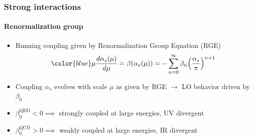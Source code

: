 \documentclass[aspectratio=43]{beamer}
\begin{document}
\begin{frame}

	\frametitle{Strong interactions}
	\framesubtitle{Renormalization group}
	
	\begin{itemize}
		\item Running coupling given by Renormalization Group Equation (RGE)
		\begin{equation}
			{\color{blue}\mu\frac{d\alpha_{s}(\mu)}{d\mu} = \beta(\alpha_{s}(\mu)) = -\sum_{n = 0}^{\infty} \beta_{n} \Big( \frac{\alpha_{s}}{\pi} \Big)^{n + 1}} \nonumber
		\end{equation}
		\item Coupling {\color{blue}$\alpha_{s}$} evolves with scale {\color{blue}$\mu$} as given by RGE $\rightarrow$ LO behavior driven by $\beta_{0}$
		\item $\beta_{0}^{\textrm{QED}} < 0 \implies$ strongly coupled at large energies, {\color{blue}UV divergent}
		\item $\beta_{0}^{\textrm{QCD}} > 0 \implies$ weakly coupled at large energies, {\color{red}IR divergent}
	\end{itemize}

\end{frame}
\end{document}

